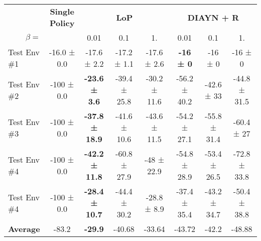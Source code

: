 \scriptsize{}
\begin{tabular}{l|c|ccc|ccc}
& \textbf{Single Policy} & \multicolumn{3}{c}{\textbf{LoP}} & \multicolumn{3}{c}{\textbf{DIAYN + R}} \\ 
\multicolumn{1}{r|}{$\beta=$}  &  & 0.01 & 0.1 & 1. & 0.01 & 0.1 & 1. \\
\midrule
Test Env \#1  & -16.0 ± 0.0 &-17.6 ± 2.2 &-17.2 ± 1.1 &-17.6 ± 2.6 &\textbf{-16 ± 0} &-16 ± 0 &-16 ± 0 \\
Test Env \#2  & -100 ± 0.0 &\textbf{-23.6 ± 3.6} &-39.4 ± 25.8 &-30.2 ± 11.6 &-56.2 ± 40.2 &-42.6 ± 33 &-44.8 ± 31.5 \\
Test Env \#3 & -100 ± 0.0 &\textbf{-37.8 ± 18.9} &-41.6 ± 10.6 &-43.6 ± 11.5 &-54.2 ± 27.1 &-55.8 ± 31.4 &-60.4 ± 27 \\
Test Env \#4  & -100 ± 0.0 &\textbf{-42.2 ± 11.8} &-60.8 ± 27.9 &-48 ± 22.9 &-54.8 ± 28.9 &-53.4 ± 26.5 &-72.8 ± 33.8 \\
Test Env \#4  & -100 ± 0.0 &\textbf{-28.4 ± 10.7} &-44.4 ± 30.2 &-28.8 ± 8.9 &-37.4 ± 35.4 &-43.2 ± 34.7 &-50.4 ± 38.8 \\
\bottomrule
\textbf{Average} & -83.2 & \textbf{-29.9} &-40.68 &-33.64 &-43.72 &-42.2 &-48.88 \\
\bottomrule
\end{tabular}